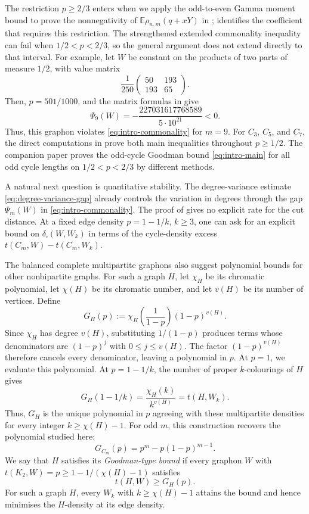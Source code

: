 \documentclass[11pt]{article}
\theoremstyle{remark}
\numberwithin{equation}{section}
\newcommand{\E}{\mathbb E}
\newcommand{\dens}[2]{t(#1,#2)}
\newcommand{\tC}[2]{t(C_{#1},#2)}
\newcommand{\edens}[1]{t(K_{2},#1)}
\begin{document}
The restriction $p\ge2/3$ enters when we apply the odd-to-even Gamma
moment bound to prove the nonnegativity of
$\E\rho_{n,m}(q+xY)$ in ;
 identifies the coefficient that requires this
restriction. The strengthened extended commonality inequality can fail
when $1/2<p<2/3$, so the general argument does not extend directly to
that interval. For example, let $W$ be constant on the products of two
parts of measure $1/2$, with value matrix
\[
  \frac1{250}\begin{pmatrix}50&193\\193&65\end{pmatrix}.
\]
Then, $p=501/1000$, and the matrix formulas in
 give
\[
  \Psi_9(W)=-\frac{227031617768589}{5\cdot10^{21}}<0.
\]
Thus, this graphon violates \eqref{eq:intro-commonality} for $m=9$.
For $C_3$, $C_5$, and $C_7$, the direct computations in
 prove both main inequalities throughout $p\ge1/2$.
The companion paper proves the odd-cycle Goodman bound
\eqref{eq:intro-main} for all odd cycle lengths on $1/2<p<2/3$ by different
methods.

A natural next question is quantitative stability. The degree-variance
estimate \eqref{eq:degree-variance-gap} already controls the variation in
degrees through the gap $\Psi_m(W)$ in
\eqref{eq:intro-commonality}. The proof of  gives no
explicit rate for the cut distance. At a fixed edge density $p=1-1/k$,
$k\ge3$, one can ask for an explicit bound on
$\delta_\square(W,W_k)$ in terms of the cycle-density excess
$\tC mW-\tC m{W_k}$.

The balanced complete multipartite graphons also suggest polynomial
bounds for other nonbipartite graphs. For such a graph $H$, let
$\chi_H$ be its chromatic polynomial, let
$\chi(H)$ be its chromatic number, and let $v(H)$ be its number of vertices.
Define
\[
  G_H(p):=\chi_H\left(\frac{1}{1-p}\right)(1-p)^{v(H)}.
\]
Since $\chi_H$ has degree $v(H)$, substituting $1/(1-p)$ produces terms
whose denominators are $(1-p)^j$ with $0\le j\le v(H)$.
The factor $(1-p)^{v(H)}$ therefore cancels every denominator, leaving
a polynomial in $p$. At $p=1$, we evaluate this polynomial.
At $p=1-1/k$, the number of proper $k$-colourings of $H$ gives
\[
  G_H(1-1/k)=\frac{\chi_H(k)}{k^{v(H)}}=\dens H{W_k}.
\]
Thus, $G_H$ is the unique polynomial in $p$ agreeing with these
multipartite densities for every integer $k\ge\chi(H)-1$.
For odd $m$, this construction recovers the polynomial studied here:
\[
  G_{C_m}(p)=p^m-p(1-p)^{m-1}.
\]
We say that $H$ satisfies its \emph{Goodman-type bound} if every graphon
$W$ with $\edens W=p\ge1-1/(\chi(H)-1)$ satisfies
\[
  \dens HW\ge G_H(p).
\]
For such a graph $H$, every $W_k$ with $k\ge\chi(H)-1$ attains the
bound and hence minimises the $H$-density at its edge density.
\end{document}
